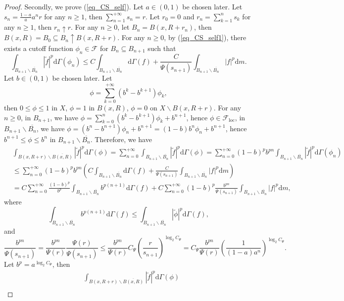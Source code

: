\documentclass[11pt,a4paper]{article}
\numberwithin{equation}{section}
\theoremstyle{plain}
\theoremstyle{definition}
\begin{document}
\begin{proof}
Secondly, we prove (\ref{eq_CS_self}). Let $a\in(0,1)$ be chosen later. Let $s_n=\frac{1-a}{a}a^nr$ for any $n\ge1$, then $\sum_{n=1}^{+\infty}s_n=r$. Let $r_0=0$ and $r_n=\sum_{k=1}^ns_k$ for any $n\ge1$, then $r_n\uparrow r$. For any $n\ge0$, let $B_n=B(x,R+r_n)$, then $B(x,R)=B_0\subseteq B_n\uparrow B(x,R+r)$. For any $n\ge0$, by (\ref{eq_CS_self1}), there exists a cutoff function $\phi_n\in\mathcal{F}$ for $B_n\subseteq B_{n+1}$ such that
$$\int_{B_{n+1}\backslash\overline{B_n}}|\widetilde{f}|^p\mathrm{d}\Gamma(\phi_n)\le C\int_{{B_{n+1}\backslash\overline{B_n}}}\mathrm{d}\Gamma(f)+\frac{C}{\Psi(s_{n+1})}\int_{{B_{n+1}\backslash\overline{B_n}}}|f|^p\mathrm{d} m.$$
Let $b\in(0,1)$ be chosen later. Let
$$\phi=\sum_{k=0}^{+\infty}(b^k-b^{k+1})\phi_k,$$
then $0\le\phi\le1$ in $X$, $\phi=1$ in $B(x,R)$, $\phi=0$ on $X\backslash B(x,R+r)$. For any $n\ge0$, in $B_{n+1}$, we have $\phi=\sum_{k=0}^n(b^k-b^{k+1})\phi_k+b^{n+1}$, hence $\phi\in\mathcal{F}_{\mathrm{loc}}$, in $B_{n+1}\backslash\overline{B_n}$, we have $\phi=(b^{n}-b^{n+1})\phi_{n}+b^{n+1}=(1-b)b^{n}\phi_{n}+b^{n+1}$, hence $b^{n+1}\le\phi\le b^n$ in $B_{n+1}\backslash\overline{B_n}$. Therefore, we have
\begin{align*}
&\int_{B(x,R+r)\backslash\overline{B(x,R)}}|\widetilde{f}|^p\mathrm{d}\Gamma(\phi)=\sum_{n=0}^{+\infty}\int_{B_{n+1}\backslash\overline{B_n}}|\widetilde{f}|^p\mathrm{d}\Gamma(\phi)=\sum_{n=0}^{+\infty}(1-b)^pb^{pn}\int_{B_{n+1}\backslash\overline{B_n}}|\widetilde{f}|^p\mathrm{d}\Gamma(\phi_n)\\
&\le\sum_{n=0}^{+\infty}(1-b)^pb^{pn}\left(C\int_{{B_{n+1}\backslash\overline{B_n}}}\mathrm{d}\Gamma(f)+\frac{C}{\Psi(s_{n+1})}\int_{{B_{n+1}\backslash\overline{B_n}}}|f|^p\mathrm{d} m\right)\\
&=C\sum_{n=0}^{+\infty}\frac{(1-b)^p}{b^{p}}\int_{{B_{n+1}\backslash\overline{B_n}}}b^{p(n+1)}\mathrm{d}\Gamma(f)+C\sum_{n=0}^{+\infty}(1-b)^p\frac{b^{pn}}{\Psi(s_{n+1})}\int_{{B_{n+1}\backslash\overline{B_n}}}|f|^p\mathrm{d} m,
\end{align*}
where
$$\int_{{B_{n+1}\backslash\overline{B_n}}}b^{p(n+1)}\mathrm{d}\Gamma(f)\le\int_{{B_{n+1}\backslash\overline{B_n}}}|\widetilde{\phi}|^p\mathrm{d}\Gamma(f),$$
and
$$\frac{b^{pn}}{\Psi(s_{n+1})}=\frac{b^{pn}}{\Psi(r)}\frac{\Psi(r)}{\Psi(s_{n+1})}\le \frac{b^{pn}}{\Psi(r)}C_{\Psi}\left(\frac{r}{s_{n+1}}\right)^{\log_2C_\Psi}=C_\Psi \frac{b^{pn}}{\Psi(r)}\left(\frac{1}{(1-a)a^{n}}\right)^{\log_2C_\Psi}.$$
Let $b^p=a^{{\log_2C_\Psi}}$, then
\begin{align*}
&\int_{B(x,R+r)\backslash\overline{B(x,R)}}|\widetilde{f}|^p\mathrm{d}\Gamma(\phi)\\

\end{align*}
\end{proof}
\end{document}
